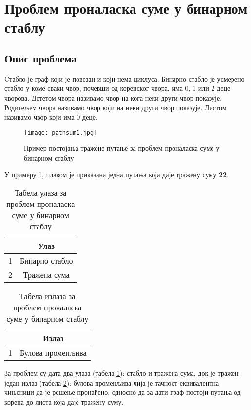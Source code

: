 
\section{Проблем проналаска суме у бинарном стаблу}

\subsection{Опис проблема}
Cтабло је граф који је повезан и који нема циклуса.
Бинарно стабло је усмерено стабло у коме сваки чвор, почевши од коренског чвора, има 0, 1 или 2 деце-чворова. Дететом чвора називамо чвор на кога неки други чвор показује.
Родитељем чвора називамо чвор који на неки други чвор показује. Листом називамо чвор који има 0 деце.

\begin{figure}[H]
    \centering
    \texttt{[image: pathsum1.jpg]}
    \caption{Пример постојања тражене путање за проблем проналаска суме у бинарном стаблу}
    \label{fig:primersume}
\end{figure}

У примеру \ref{fig:primersume}, плавом је приказана једна путања која даје тражену суму \textbf{22}.


\begin{table}[H]
    \centering
    \begin{tabular}{@{}c|c@{}}
        & \textbf{Улаз}           \\
        \hline
    1 & Бинарно стабло \\
    2 & Тражена сума  
    \end{tabular}
    \caption{Табела улаза за проблем проналаска суме у бинарном стаблу}
    \label{table:ulazi}
\end{table}

\begin{table}[H]
    \centering
    \begin{tabular}{@{}c|c@{}}
      & \textbf{Излаз}             \\
      \hline
    1 & Булова променљива
    \end{tabular}
    \caption{Табела излаза за проблем проналаска суме у бинарном стаблу}
    \label{table:izlazi}
\end{table}

За проблем су дата два улаза (табела \ref{table:ulazi}): стабло и тражена сума, док је тражен један излаз (табела \ref{table:izlazi}): булова променљива чија је тачност еквивалентна чињеници да је решење пронађено, односно
да за дати граф постоји путања од корена до листа која даје тражену суму.

